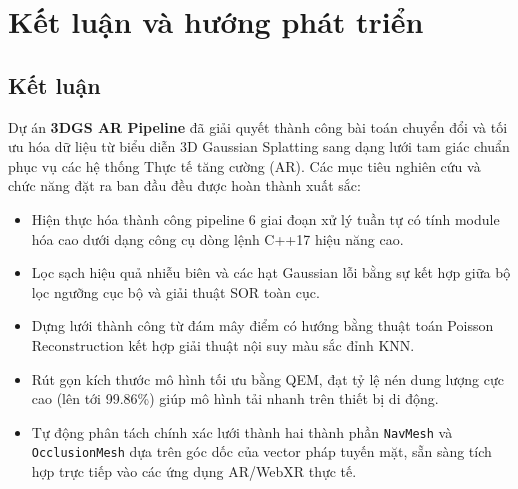 \documentclass[a4paper,12pt]{report}
\begin{document}
\chapter{Kết luận và hướng phát triển}

\section{Kết luận}
Dự án \textbf{3DGS AR Pipeline} đã giải quyết thành công bài toán chuyển đổi và tối ưu hóa dữ liệu từ biểu diễn 3D Gaussian Splatting sang dạng lưới tam giác chuẩn phục vụ các hệ thống Thực tế tăng cường (AR). Các mục tiêu nghiên cứu và chức năng đặt ra ban đầu đều được hoàn thành xuất sắc:
\begin{itemize}
    \item Hiện thực hóa thành công pipeline 6 giai đoạn xử lý tuần tự có tính module hóa cao dưới dạng công cụ dòng lệnh C++17 hiệu năng cao.
    \item Lọc sạch hiệu quả nhiễu biên và các hạt Gaussian lỗi bằng sự kết hợp giữa bộ lọc ngưỡng cục bộ và giải thuật SOR toàn cục.
    \item Dựng lưới thành công từ đám mây điểm có hướng bằng thuật toán Poisson Reconstruction kết hợp giải thuật nội suy màu sắc đỉnh KNN.
    \item Rút gọn kích thước mô hình tối ưu bằng QEM, đạt tỷ lệ nén dung lượng cực cao (lên tới 99.86\%) giúp mô hình tải nhanh trên thiết bị di động.
    \item Tự động phân tách chính xác lưới thành hai thành phần \texttt{NavMesh} và \texttt{OcclusionMesh} dựa trên góc dốc của vector pháp tuyến mặt, sẵn sàng tích hợp trực tiếp vào các ứng dụng AR/WebXR thực tế.
\end{itemize}
\end{document}
